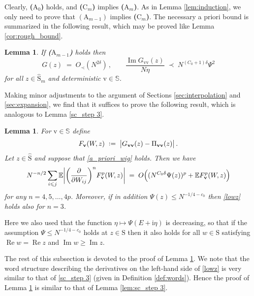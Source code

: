 \documentclass[11pt]{article} %
\numberwithin{equation}{section}
\numberwithin{figure}{section}
\theoremstyle{plain} %
\newtheorem{lemma}[theorem]{Lemma}
\theoremstyle{definition} %
\newcommand{\f}[1]{\boldsymbol{\mathrm{#1}}} %
\newcommand{\bb}{\mathbb} %
\newcommand{\wh}{\widehat}
\newcommand{\E}{\mathbb{E}}
\newcommand{\ii}{\mathrm{i}}
\newcommand*{\deq}{\mathrel{\vcenter{\baselineskip0.65ex \lineskiplimit0pt \hbox{.}\hbox{.}}}=}
\renewcommand{\leq}{\leqslant}
\renewcommand{\geq}{\geqslant}
\newcommand{\pB}[1]{\Bigl({#1}\Bigr)}
\newcommand{\pbb}[1]{\biggl({#1}\biggr)}
\newcommand{\absb}[1]{\bigl\lvert #1 \bigr\rvert}
\newcommand{\absbb}[1]{\biggl\lvert #1 \biggr\rvert}
\DeclareMathOperator{\re}{Re}
\DeclareMathOperator{\im}{Im}
\begin{document}
Clearly, \textbf{($\f A_0$)} holds, and \textbf{($\f C_m$)} implies \textbf{($\f A_m$)}. As in Lemma \ref{lem:induction}, we only need to prove that $(\f A_{m-1}) $ implies  \textbf{($\f C_m$)}. The necessary a priori bound is summarized in the following result, which may be proved like Lemma \ref{cor:rough_bound}.

\begin{lemma}
If \textbf{($\f A_{m-1}$)} holds then
\begin{equation} \label{a_priori_wig}
G(z) \;=\; O_\prec(N^{2 \delta})\,, \qquad \frac{\im G_{\f v \f v}(z)}{N \eta} \;\prec\; N^{(C_0 + 1) \delta} \Psi^2
\end{equation}
for all $z \in \wh {\f S}_m$ and deterministic $\f v \in \bb S$.
\end{lemma}


Making minor adjustments to the argument of Sections \ref{sec:interpolation} and \ref{sec:expansion}, we find that it suffices to prove the following result, which is analogous to Lemma \ref{sc_step 3}.

\begin{lemma} \label{lem:Wig_main_est}
For $\f v \in \bb S$ define
\begin{equation*}
F_{\f v}(W,z) \;\deq\; \absb{G_{\f v \f v}(z) - \Pi_{\f v \f v}(z)}\,.
\end{equation*}
Let $z \in \wh{\f S}$ and suppose that \eqref{a_priori_wig} holds. Then we have
\begin{equation}\label{lowz}
N^{-n/2}   \sum_{i\leq j} \E \absbb{ \pbb{\frac{\partial}{\partial W_{ij}}}^n F^p_{\f v}(W,z)} \;=\; O \pB{(N^{C_0 \delta}\Psi(z))^p+  \E F_{\f v}^p(W,z)}
\end{equation}
for any $n = 4, 5, \dots, 4p$. Moreover, if in addition $\Psi(z) \leq N^{-1/4-c_0}$ then \eqref{lowz} holds also for $n = 3$.
\end{lemma}

Here we also used that the function $\eta \mapsto \Psi(E + \ii \eta)$ is decreasing, so that if the assumption $\Psi \leq N^{-1/4-c_0}$ holds at $z \in \f S$ then it also holds for all $w \in \f S$ satisfying $\re w = \re z$ and $\im w \geq \im z$.

The rest of this subsection is devoted to the proof of Lemma \ref{lem:Wig_main_est}. We note that the word structure describing the derivatives on the left-hand side of \eqref{lowz} is very similar to that of \eqref{sc_step 3} (given in Definition \ref{def:words}). Hence the proof of Lemma \ref{lem:Wig_main_est} is similar to that of Lemma \ref{lem:sc_step 3}.
\end{document}
